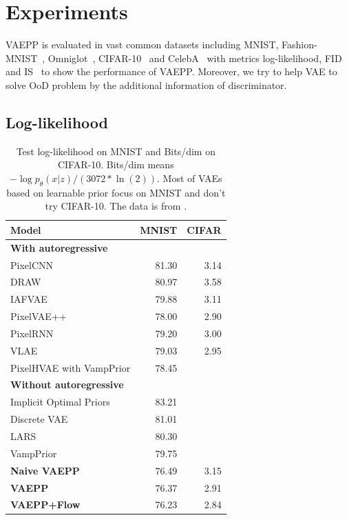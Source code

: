 \section{Experiments}
VAEPP is evaluated in vast common datasets including MNIST, Fashion-MNIST~\cite{xiao2017/online}, Omniglot~\cite{lake2015human}, CIFAR-10~\cite{krizhevsky2009learning} and CelebA~\cite{liu2015deep} with metrics log-likelihood, FID~\cite{heusel2017gans} and IS~\cite{salimans2016improved} to show the performance of VAEPP. Moreover, we try to help VAE to solve OoD problem by the additional information of discriminator. 
\subsection{Log-likelihood}
\begin{table}[tb]
\centering
\begin{tabular}{lrr}  
\toprule
Model  &  MNIST & CIFAR\\
\midrule
\textbf{With autoregressive}   \\
PixelCNN         &  81.30  &  3.14   \\
DRAW             &  80.97  &  3.58    \\
IAFVAE           &  79.88  &  3.11    \\
PixelVAE++       &  78.00  &  2.90   \\
PixelRNN         &  79.20  &  3.00    \\
VLAE             &  79.03  &  2.95     \\
PixelHVAE with VampPrior &  78.45  &     \\
\midrule
\textbf{Without autoregressive}   \\
Implicit Optimal Priors & 83.21 \\
Discrete VAE     &  81.01     \\
LARS             &  80.30     \\
VampPrior        &  79.75     \\
\textbf{Naive VAEPP}      &  76.49 & 3.15    \\
\textbf{VAEPP}            &  76.37 & 2.91	    \\
\textbf{VAEPP+Flow}       &  76.23 & 2.84    \\
\bottomrule
\end{tabular}
\caption{Test log-likelihood on MNIST and Bits/dim on CIFAR-10. Bits/dim means $-\log p_\theta(x|z) / (3072 * \ln(2))$. Most of VAEs based on learnable prior focus on MNIST and don't try CIFAR-10. The data is from \protect\cite{maaloe2019biva}. 
}
\end{table}
